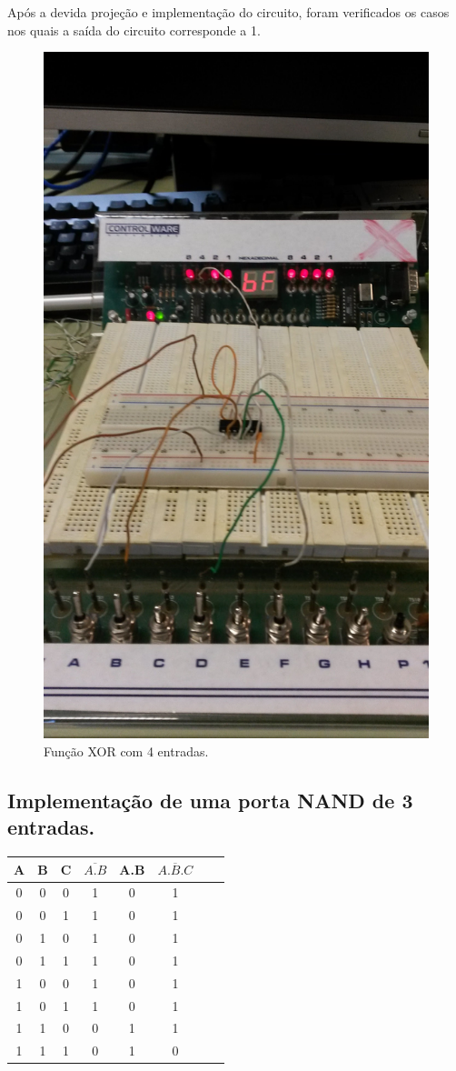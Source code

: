 \documentclass[12pt]{article}
\begin{document}
\begin{itemize}
		Após a devida projeção e implementação do circuito, foram verificados os casos nos quais a saída do circuito corresponde a 1.
		
		\begin{figure}[H]
			\centering
			\includegraphics[width=.5\textwidth]{circuitoxor2.jpg}
			\caption{Função XOR com 4 entradas.}
			\label{fig:exemplo}
		\end{figure}
		
	\end{itemize}
	
	\subsection{Implementação de uma porta NAND de 3 entradas.}
	\label{sec:NAND}
	
	\begin{table}[H]
		\centering
		\begin{tabular}{|c|c|c|c|c|c|c|c|}
			\cline{1-6}
			\multicolumn{1}{|c|}{A} & \multicolumn{1}{|c|}{B} & \multicolumn{1}{|c|}{C} & \multicolumn{1}{|c|}{$\overline{A.B}$} & \multicolumn{1}{|c|}{A.B} & \multicolumn{1}{|c|}{$\overline{A.B.C}$}\\
			\hline
			0 & 0 & 0 & 1 & 0 & 1\\
			0 & 0 & 1 & 1 & 0 & 1\\
			0 & 1 & 0 & 1 & 0 & 1\\
			0 & 1 & 1 & 1 & 0 & 1\\
			1 & 0 & 0 & 1 & 0 & 1\\
			1 & 0 & 1 & 1 & 0 & 1\\
			1 & 1 & 0 & 0 & 1 & 1\\
			1 & 1 & 1 & 0 & 1 & 0\\
			\hline
		\end{tabular}
		\label{Porta NAND}
	\end{table}
	
\end{document}
